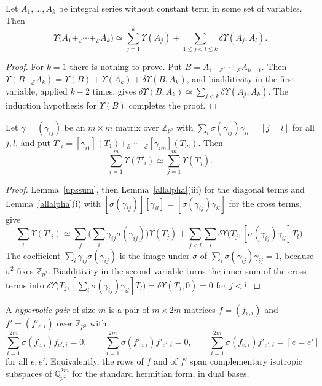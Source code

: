 \begin{lemma}\label{upssum}
Let $A_1,\dots,A_k$ be integral series without constant term in some set of variables. Then
\[
\Upsilon\big(A_1+_{\mathcal E}\cdots+_{\mathcal E}A_k\big)\simeq\sum_{j=1}^k\Upsilon(A_j)+\sum_{1\le j<l\le k}\delta\Upsilon(A_j,A_l).
\]
\end{lemma}

\begin{proof}
For $k=1$ there is nothing to prove. Put $B=A_1+_{\mathcal E}\cdots+_{\mathcal E}A_{k-1}$. Then $\Upsilon(B+_{\mathcal E}A_k)=\Upsilon(B)+\Upsilon(A_k)+\delta\Upsilon(B,A_k)$, and biadditivity in the first variable, applied $k-2$ times, gives $\delta\Upsilon(B,A_k)\simeq\sum_{j<k}\delta\Upsilon(A_j,A_k)$. The induction hypothesis for $\Upsilon(B)$ completes the proof.
\end{proof}

\begin{proposition}\label{unitaryinv}
Let $\gamma=(\gamma_{ij})$ be an $m\times m$ matrix over $\mathbb Z_{p^2}$ with $\sum_i\sigma(\gamma_{ij})\gamma_{il}=[j=l]$ for all $j,l$, and put $T'_i=[\gamma_{i1}](T_1)+_{\mathcal E}\cdots+_{\mathcal E}[\gamma_{im}](T_m)$. Then
\[
\sum_{i=1}^m\Upsilon(T'_i)\simeq\sum_{j=1}^m\Upsilon(T_j).
\]
\end{proposition}

\begin{proof}
Lemma~\ref{upssum}, then Lemma~\ref{allalpha}(iii) for the diagonal terms and Lemma~\ref{allalpha}(i) with $[\sigma(\gamma_{ij})][\gamma_{il}]=[\sigma(\gamma_{ij})\gamma_{il}]$ for the cross terms, give
\[
\sum_i\Upsilon(T'_i)\simeq\sum_j\Big(\sum_i\gamma_{ij}\sigma(\gamma_{ij})\Big)\Upsilon(T_j)+\sum_{j<l}\sum_i\delta\Upsilon\big(T_j,[\sigma(\gamma_{ij})\gamma_{il}]T_l\big).
\]
The coefficient $\sum_i\gamma_{ij}\sigma(\gamma_{ij})$ is the image under $\sigma$ of $\sum_i\sigma(\gamma_{ij})\gamma_{ij}=1$, because $\sigma^2$ fixes $\mathbb Z_{p^2}$. Biadditivity in the second variable turns the inner sum of the cross terms into $\delta\Upsilon\big(T_j,[\sum_i\sigma(\gamma_{ij})\gamma_{il}]T_l\big)=\delta\Upsilon(T_j,0)=0$ for $j<l$.
\end{proof}

A \emph{hyperbolic pair} of size $m$ is a pair of $m\times2m$ matrices $f=(f_{e,i})$ and $f'=(f'_{e,i})$ over $\mathbb Z_{p^2}$ with
\begin{equation}\label{hyppair}
\sum_{i=1}^{2m}\sigma(f_{e,i})f_{e',i}=0,\qquad\sum_{i=1}^{2m}\sigma(f'_{e,i})f'_{e',i}=0,\qquad\sum_{i=1}^{2m}\sigma(f_{e,i})f'_{e',i}=[e=e']
\end{equation}
for all $e,e'$. Equivalently, the rows of $f$ and of $f'$ span complementary isotropic subspaces of $\mathbb Q_{p^2}^{2m}$ for the standard hermitian form, in dual bases.

